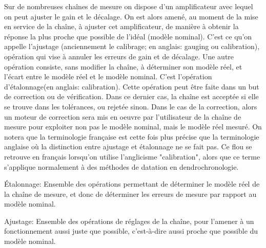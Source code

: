 \documentclass[main.tex]{subfiles}
\begin{document}
Sur de nombreuses chaînes de mesure on dispose d'un amplificateur avec lequel on peut ajuster le gain et le décalage. On est alors amené, au moment de la mise en service de la chaîne, à ajuster cet amplificateur, de manière à obtenir la réponse la plus proche que possible de l'idéal (modèle nominal). C'est ce qu'on appelle l'ajustage (anciennement le calibrage; en anglais: gauging ou calibration), opération qui vise à annuler les erreurs de gain et de décalage. Une autre opération consiste, sans modifier la chaîne, à déterminer son modèle réel, et l'écart entre le modèle réel et le modèle nominal. C'est l'opération d'étalonnage(en anglais: calibration). Cette opération peut être faite dans un but de correction ou de vérification. Dans ce dernier cas, la chaîne est acceptée si elle se trouve dans les tolérances, ou rejetée sinon. Dans le cas de la correction, alors un moteur de correction sera mis en oeuvre par l'utilisateur de la chaîne de mesure pour exploiter non pas le modèle nominal, mais le modèle réel mesuré.
On notera que la terminologie française est cette fois plus précise que la terminologie anglaise où la distinction entre ajustage et étalonnage ne se fait pas. Ce flou se retrouve en français lorsqu'on utilise l'anglicisme "calibration", alors que ce terme s'applique normalement à des méthodes de datation en dendrochronologie.
\begin{definition}
	Étalonnage:	 Ensemble des opérations permettant de déterminer le modèle réel de la chaîne de mesure, et donc de déterminer les erreurs de mesure par rapport au modèle nominal.
\end{definition}

\begin{definition}
	Ajustage: Ensemble des opérations de réglages de la chaîne, pour l'amener à un fonctionnement aussi juste que possible, c'est-à-dire aussi proche que possible du modèle nominal.
\end{definition}
\end{document}
